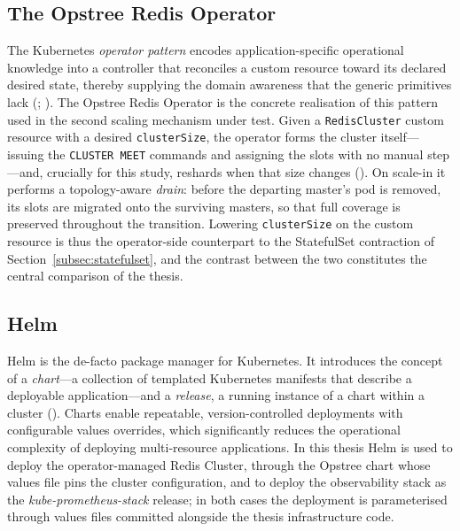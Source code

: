 \subsection{The Opstree Redis Operator}
\label{subsec:operator}

The Kubernetes \textit{operator pattern} encodes application-specific operational knowledge
into a controller that reconciles a custom resource toward its declared desired state, thereby
supplying the domain awareness that the generic primitives lack
(\cite{kubernetes:operatorpattern}; \cite{k8s:operator}). The Opstree Redis Operator is the
concrete realisation of this pattern used in the second scaling mechanism under test. Given a
\texttt{RedisCluster} custom resource with a desired \texttt{clusterSize}, the operator forms
the cluster itself---issuing the \texttt{CLUSTER MEET} commands and assigning the slots with no
manual step---and, crucially for this study, reshards when that size changes
(\cite{opstree:redisoperator}). On scale-in it performs a topology-aware \textit{drain}:
before the departing master's pod is removed, its slots are migrated onto the surviving
masters, so that full coverage is preserved throughout the transition. Lowering
\texttt{clusterSize} on the custom resource is thus the operator-side counterpart to the
StatefulSet contraction of Section~\ref{subsec:statefulset}, and the contrast between the two
constitutes the central comparison of the thesis.

\subsection{Helm}
\label{subsec:helm}

Helm is the de-facto package manager for Kubernetes. It introduces the concept of a
\textit{chart}---a collection of templated Kubernetes manifests that describe a deployable
application---and a \textit{release}, a running instance of a chart within a cluster
(\cite{helm:docs}). Charts enable repeatable, version-controlled deployments with configurable
values overrides, which significantly reduces the operational complexity of deploying
multi-resource applications. In this thesis Helm is used to deploy the operator-managed Redis
Cluster, through the Opstree chart whose values file pins the cluster configuration, and to
deploy the observability stack as the \textit{kube-prometheus-stack} release; in both cases
the deployment is parameterised through values files committed alongside the thesis
infrastructure code.

